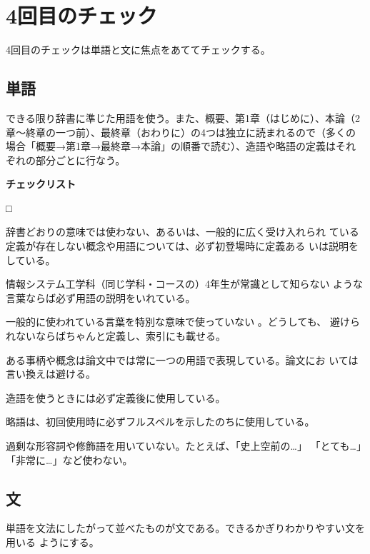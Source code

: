 \documentclass[11pt,a4j]{jsarticle}
\begin{document}
\section{4回目のチェック}

4回目のチェックは単語と文に焦点をあててチェックする。

\subsection{単語}

できる限り辞書に準じた用語を使う。また、概要、第1章（はじめに）、本論（2
章〜終章の一つ前）、最終章（おわりに）の4つは独立に読まれるので（多くの
場合「概要→第1章→最終章→本論」の順番で読む）、造語や略語の定義はそれ
ぞれの部分ごとに行なう。

\begin{flushleft}
 {\bf チェックリスト}
\end{flushleft}
\begin{list}%
 {□} %
 {} %
 \item 辞書どおりの意味では使わない、あるいは、一般的に広く受け入れられ
       ている定義が存在しない概念や用語については、必ず初登場時に定義ある
       いは説明をしている。
 \item 情報システム工学科（同じ学科・コースの）4年生が常識として知らない
       ような言葉ならば必ず用語の説明をいれている。
 \item 一般的に使われている言葉を特別な意味で使っていない 。どうしても、
       避けられないならばちゃんと定義し、索引にも載せる。
 \item ある事柄や概念は論文中では常に一つの用語で表現している。論文にお
       いては言い換えは避ける。
 \item 造語を使うときには必ず定義後に使用している。
 \item 略語は、初回使用時に必ずフルスペルを示したのちに使用している。
 \item 過剰な形容詞や修飾語を用いていない。たとえば、「史上空前の…」
       「とても…」「非常に…」など使わない。
\end{list}

\subsection{文}

単語を文法にしたがって並べたものが文である。できるかぎりわかりやすい文を用いる
ようにする。
\end{document}
